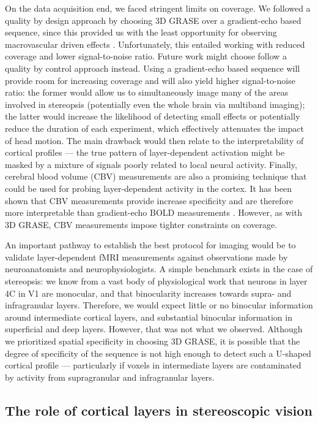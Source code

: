 On the data acquisition end, we faced stringent limits on coverage. We followed a quality by design approach by choosing 3D GRASE over a gradient-echo based sequence, since this provided us with the least opportunity for observing macrovascular driven effects \cite{DeMartino:2013qy}. Unfortunately, this entailed working with reduced coverage and lower signal-to-noise ratio. Future work might choose follow a quality by control approach instead. Using a gradient-echo based sequence will provide room for increasing coverage and will also yield higher signal-to-noise ratio: the former would allow us to simultaneously image many of the areas involved in stereopsis (potentially even the whole brain via multiband imaging); the latter would increase the likelihood of detecting small effects or potentially reduce the duration of each experiment, which effectively attenuates the impact of head motion. The main drawback would then relate to the interpretability of cortical profiles --- the true pattern of layer-dependent activation might be masked by a mixture of signals poorly related to local neural activity. Finally, cerebral blood volume (CBV) measurements are also a promising technique that could be used for probing layer-dependent activity in the cortex. It has been shown that CBV measurements provide increase specificity and are therefore more interpretable than gradient-echo BOLD measurements \cite{Huber:2015ao}. However, as with 3D GRASE, CBV measurements impose tighter constraints on coverage.

An important pathway to establish the best protocol for imaging would be to validate layer-dependent fMRI measurements against observations made by neuroanatomists and neurophysiologists. A simple benchmark exists in the case of stereopsis: we know from a vast body of physiological work that neurons in layer 4C in V1 are monocular, and that binocularity increases towards supra- and infragranular layers. Therefore, we would expect little or no binocular information around intermediate cortical layers, and substantial binocular information in superficial and deep layers. However, that was not what we observed. Although we prioritized spatial specificity in choosing 3D GRASE, it is possible that the degree of specificity of the sequence is not high enough to detect such a U-shaped cortical profile --- particularly if voxels in intermediate layers are contaminated by activity from supragranular and infragranular layers.


\subsection{The role of cortical layers in stereoscopic vision}

